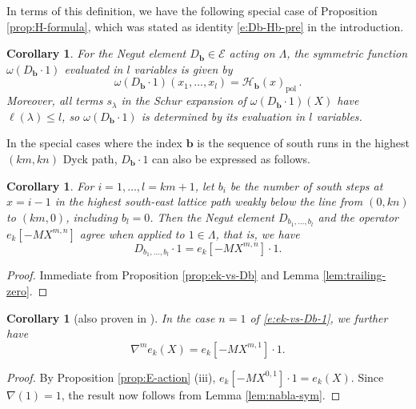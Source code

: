 \documentclass[12pt]{amsart}
\newtheorem{cor}[thm]{Corollary}
\theoremstyle{definition}
\theoremstyle{remark}
\newcommand{\bb}{{\mathbf b}}
\newcommand{\Ecal}{{\mathcal E}}
\newcommand{\Hcat}{{\mathcal H}}  %
\DeclareMathOperator{\pol}{pol}
\begin{document}
In terms of this definition, we have the following special case of
Proposition \ref{prop:H-formula}, which was stated as identity
\eqref{e:Db-Hb-pre} in the introduction.

\begin{cor}\label{cor:Db-Hb} For the Negut element $D_{\bb }\in \Ecal
$ acting on $\Lambda $, the symmetric function $\omega (D_{\bb }\cdot
1)$ evaluated in $l$ variables is given by
\begin{equation}\label{e:Db-Hb}
\omega (D_{\bb } \cdot 1)(x_{1},\ldots,x_{l}) = \Hcat _{\bb }(x)_{\pol
}\,.
\end{equation}
Moreover, all terms $s_{\lambda }$ in the Schur expansion of $\omega
(D_{\bb } \cdot 1)(X)$ have $\ell(\lambda )\leq l$, so $\omega (D_{\bb }
\cdot 1)$ is determined by its evaluation in $l$ variables.
\end{cor}

In the special cases where the index $\bb $ is the sequence of south
runs in the highest $(km,kn)$ Dyck path, $D_{\bb }\cdot 1$ can also be
expressed as follows.

\begin{cor}\label{cor:ek-vs-Db}
For $i = 1,\ldots,l=km+1$, let $b_{i}$ be the number of south steps at
$x = i-1$ in the highest south-east lattice path weakly below the
line from $(0,kn)$ to $(km,0)$, including $b_{l}=0$.  Then the Negut
element $D_{b_{1},\ldots,b_{l}}$ and the operator $e_{k}[-MX^{m,n}]$
agree when applied to $1\in \Lambda $, that is, we have
\begin{equation}\label{e:ek-vs-Db-1}
D_{b_{1},\ldots,b_{l}} \cdot 1 = e_{k}[-MX^{m,n}]\cdot 1.
\end{equation}
\end{cor}

\begin{proof}
Immediate from Proposition \ref{prop:ek-vs-Db} and Lemma
\ref{lem:trailing-zero}.
\end{proof}

\begin{cor}[also proven in \cite{BeGaSeXi16}]\label{cor:nabla-ek}
In the case $n=1$ of \eqref{e:ek-vs-Db-1}, we further have
\begin{equation}\label{e:nabla-ek}
\nabla ^{m} e_{k}(X) = e_{k}[-MX^{m,1}]\cdot 1.
\end{equation}
\end{cor}

\begin{proof}
By Proposition \ref{prop:E-action} (iii), $e_{k}[-MX^{0,1}]\cdot 1 =
e_{k}(X)$.  Since $\nabla (1) = 1$, the result now follows from Lemma
\ref{lem:nabla-sym}.
\end{proof}
\end{document}
